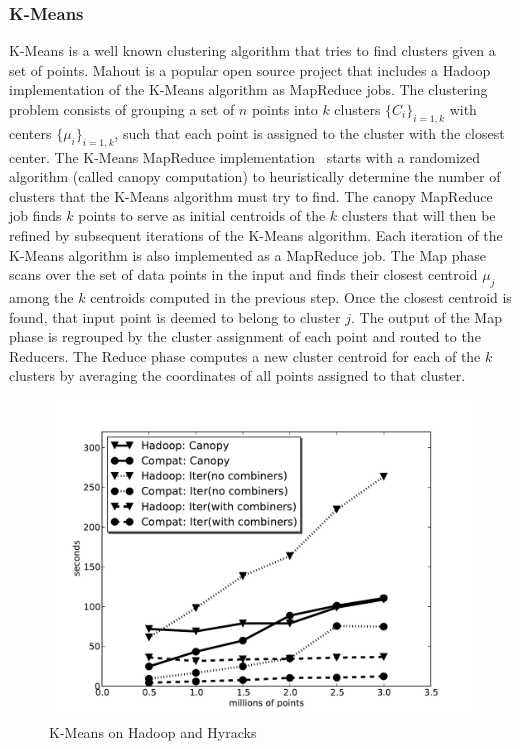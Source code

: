 \subsubsection{K-Means}
K-Means is a well known clustering algorithm that tries to find clusters given a set of points. Mahout \cite{mahout:website} is a popular open source project
that includes a Hadoop implementation of the K-Means algorithm as MapReduce jobs.
The clustering problem
consists of grouping a set of $n$ points into $k$ clusters
$\{C_i\}_{i=1,k}$ with centers $\{\mu_i\}_{i=1,k}$, such that each
point is assigned to the cluster with the closest center. The K-Means
MapReduce implementation~\cite{nips06-mapreducemulticore} starts with a randomized
algorithm (called canopy computation) to heuristically determine the number of
clusters that the K-Means algorithm must try to find.
The canopy MapReduce job finds $k$ points to serve as initial centroids of the
$k$ clusters that will then be refined by subsequent iterations of the K-Means algorithm.
Each iteration of the K-Means algorithm is also implemented as a MapReduce job. The Map phase
scans over the set of data points in the input and finds their closest centroid $\mu_j$ among
the $k$ centroids computed in the previous step. Once the closest centroid is found,
that input point is deemed to belong to cluster $j$. The output of the Map phase is
regrouped by the cluster assignment of each point and routed to the Reducers.
The Reduce phase computes a new cluster centroid for each of the $k$ clusters by averaging the coordinates of all points assigned to that cluster.

\begin{figure} [htb!]
  \centering
  \includegraphics[scale=0.6]{images/KMeans}
  \caption{K-Means on Hadoop and Hyracks}
  \label{fig:kmeans}
\end{figure}

